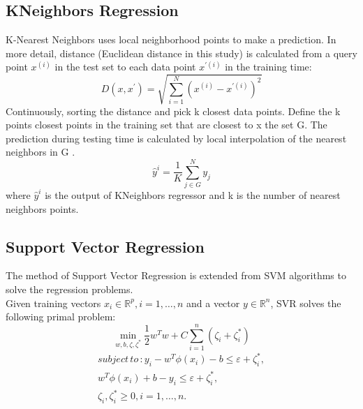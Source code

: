 \documentclass[12pt,a4paper]{report}
\begin{document}
\subsection{KNeighbors Regression}
K-Nearest Neighbors uses local neighborhood points to make a prediction. In more detail, distance (Euclidean distance in this study) is calculated from a query point $x^{(i)}$ in the test set to each data point $x^{'(i)}$ in the training time:
\begin{equation}
D(x,x^{'}) = \sqrt{\sum_{i=1}^{N}(x^{(i)} - x^{'(i)})^{2}}
\end{equation}
Continuously, sorting the distance and pick k closest data points. Define the k points closest points in the training set that are closest to x the set G. The prediction during testing time is calculated by local interpolation of the nearest neighbors in G \cite{Ristanto}.
\begin{equation}
\hat{y}^{i} = \frac{1}{K} \sum_{j\in G}^{N} y_{j}
\end{equation}
where $\hat{y}^{i}$ is the output of KNeighbors regressor and k is the number of nearest neighbors points.

\subsection{Support Vector Regression}
The method of Support Vector Regression is extended from SVM algorithms to solve the regression problems.\\
Given training vectors $x_{i} \in \mathbb{R}^{p}, i = 1, \ldots, n$ and a vector $y \in \mathbb{R}^{n}$, SVR solves the following primal problem:
\begin{equation}
\min_{w,b,\zeta,\zeta^{\ast}} \frac{1}{2}w^{T}w + C\sum_{i=1}^{n}(\zeta_{i} + \zeta_{i}^{\ast})
\end{equation}
\begin{align*}
subject\,to\,: y_{i} - w^{T}\phi(x_{i}) - b \leq \varepsilon + \zeta_{i}^{\ast},\\
w^{T}\phi(x_{i}) + b - y_{i} \leq \varepsilon + \zeta_{i}^{\ast},\\
\zeta_{i},\zeta_{i}^{\ast} \geq 0, i = 1,\ldots,n.
\end{align*}
\end{document}
